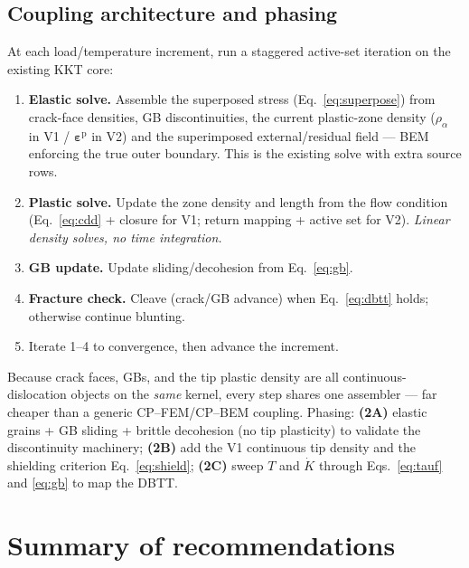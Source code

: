 \documentclass[11pt]{article}
\newcommand{\epspl}{\bm{\varepsilon}^{\mathrm{p}}}
\begin{document}
\subsection{Coupling architecture and phasing}
At each load/temperature increment, run a staggered active-set iteration on the
existing KKT core:
\begin{enumerate}[leftmargin=1.4em,itemsep=2pt]
\item \textbf{Elastic solve.} Assemble the superposed stress
(Eq.~\eqref{eq:superpose}) from crack-face densities, GB discontinuities, the
current plastic-zone density ($\rho_{\alpha}$ in V1 / $\epspl$ in V2) and the
superimposed external/residual field --- BEM enforcing the true outer boundary.
This is the existing solve with extra source rows.
\item \textbf{Plastic solve.} Update the zone density and length from the flow
condition (Eq.~\eqref{eq:cdd} + closure for V1; return mapping + active set for
V2). \emph{Linear density solves, no time integration.}
\item \textbf{GB update.} Update sliding/decohesion from Eq.~\eqref{eq:gb}.
\item \textbf{Fracture check.} Cleave (crack/GB advance) when
Eq.~\eqref{eq:dbtt} holds; otherwise continue blunting.
\item Iterate 1--4 to convergence, then advance the increment.
\end{enumerate}

Because crack faces, GBs, and the tip plastic density are all
continuous-dislocation objects on the \emph{same} kernel, every step shares one
assembler --- far cheaper than a generic CP--FEM/CP--BEM coupling. Phasing:
\textbf{(2A)} elastic grains + GB sliding + brittle decohesion (no tip
plasticity) to validate the discontinuity machinery; \textbf{(2B)} add the V1
continuous tip density and the shielding criterion Eq.~\eqref{eq:shield};
\textbf{(2C)} sweep $T$ and $\dot K$ through Eqs.~\eqref{eq:tauf} and
\eqref{eq:gb} to map the DBTT.

\section{Summary of recommendations}
\label{sec:summary}
\end{document}
